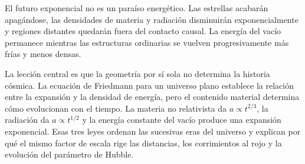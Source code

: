 El futuro exponencial no es un paraíso energético. Las estrellas acabarán apagándose, las densidades de materia y radiación disminuirán exponencialmente y regiones distantes quedarán fuera del contacto causal. La energía del vacío permanece mientras las estructuras ordinarias se vuelven progresivamente más frías y menos densas.

\begin{classroomqa}
\end{classroomqa}

La lección central es que la geometría por sí sola no determina la historia cósmica. La ecuación de Friedmann para un universo plano establece la relación entre la expansión y la densidad de energía, pero el contenido material determina cómo evolucionan con el tiempo. La materia no relativista da \(a\propto t^{2/3}\), la radiación da \(a\propto t^{1/2}\) y la energía constante del vacío produce una expansión exponencial. Esas tres leyes ordenan las sucesivas eras del universo y explican por qué el mismo factor de escala rige las distancias, los corrimientos al rojo y la evolución del parámetro de Hubble.
